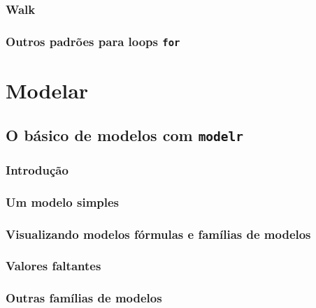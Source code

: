 \documentclass[
]{latex/krantz}
\theoremstyle{definition}
\theoremstyle{definition}
\theoremstyle{definition}
\theoremstyle{definition}
\theoremstyle{remark}
\begin{document}
\hypertarget{walk}{%
\section{Walk}\label{walk}}

\hypertarget{outros-padruxf5es-para-loops-for}{%
\section{\texorpdfstring{Outros padrões para loops \texttt{for}}{Outros padrões para loops for}}\label{outros-padruxf5es-para-loops-for}}

\hypertarget{part-modelar}{%
\part{Modelar}\label{part-modelar}}

\hypertarget{o-buxe1sico-de-modelos-com-modelr}{%
\chapter{\texorpdfstring{O básico de modelos com \texttt{modelr}}{O básico de modelos com modelr}}\label{o-buxe1sico-de-modelos-com-modelr}}

\hypertarget{introduuxe7uxe3o-14}{%
\section{Introdução}\label{introduuxe7uxe3o-14}}

\hypertarget{um-modelo-simples}{%
\section{Um modelo simples}\label{um-modelo-simples}}

\hypertarget{visualizando-modelos-fuxf3rmulas-e-famuxedlias-de-modelos}{%
\section{Visualizando modelos fórmulas e famílias de modelos}\label{visualizando-modelos-fuxf3rmulas-e-famuxedlias-de-modelos}}

\hypertarget{valores-faltantes-2}{%
\section{Valores faltantes}\label{valores-faltantes-2}}

\hypertarget{outras-famuxedlias-de-modelos}{%
\section{Outras famílias de modelos}\label{outras-famuxedlias-de-modelos}}
\end{document}
